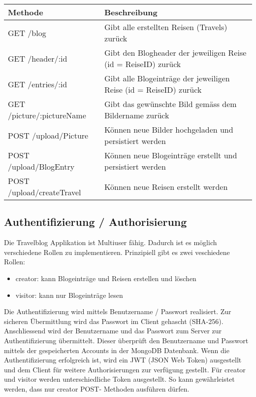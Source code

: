 \documentclass[../main.tex]{subfiles}
\begin{document}
\begin{tabular}{ p{4.5cm} | p{9.5cm}}
 \textbf{Methode} & \textbf{Beschreibung}\\
 \hline
 GET /blog                 &   Gibt alle erstellten Reisen (Travels) zurück                         \\ 
 GET /header/:id           &   Gibt den Blogheader der jeweiligen Reise (id = ReiseID) zurück       \\ 
 GET /entries/:id          &   Gibt alle Blogeinträge der jeweiligen Reise (id = ReiseID) zurück    \\ 
 GET /picture/:pictureName &   Gibt das gewünschte Bild gemäss dem Bildername zurück                \\ 
 POST /upload/Picture      &   Können neue Bilder hochgeladen und persistiert werden                \\ 
 POST /upload/BlogEntry    &   Können neue Blogeinträge erstellt und persistiert werden             \\ 
 POST /upload/createTravel &   Können neue Reisen erstellt werden                                   \\ 
\end{tabular}

\subsection{Authentifizierung / Authorisierung}
Die Travelblog Applikation ist Multiuser fähig. Dadurch ist es möglich verschiedene Rollen zu implementieren. Prinzipiell gibt es zwei veschiedene Rollen:
\begin{itemize}
    \item creator: kann Blogeinträge und Reisen erstellen und löschen
    \item visitor: kann nur Blogeinträge lesen
\end{itemize}
Die Authentifizierung wird mittels Benutzername / Passwort realisiert. Zur sicheren Übermittlung wird das Passwort im Client gehascht (SHA-256). Anschliessend wird der Benutzername und das Passwort zum Server zur Authentifizierung übermittelt. Dieser überprüft den Benutzername und Passwort mittels der gespeicherten Accounts in der MongoDB Datenbank. Wenn die Authentifizierung erfolgreich ist, wird ein JWT (JSON Web Token) ausgestellt und dem Client für weitere Authorisierungen zur verfügung gestellt. Für creator und visitor werden unterschiedliche Token ausgestellt. So kann gewährleistet werden, dass nur creator POST- Methoden ausführen dürfen.
\end{document}
